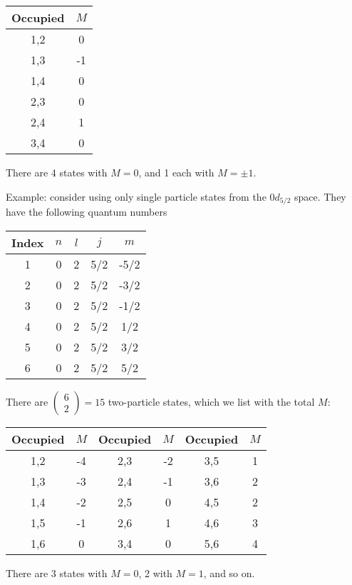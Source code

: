 \begin{center}
\begin{tabular}{|c|c|}\hline
Occupied & $M$  \\ \hline
1,2 & 0    \\
1,3 & -1              \\
1,4 & 0             \\
2,3 & 0           \\
2,4 & 1 \\
3,4 &  0     \\ \hline
\end{tabular}
There are 4 states with $M= 0$, 
and 1 each with $M = \pm 1$.
\end{center}

Example: consider using only single particle states from the $0d_{5/2}$ space. 
They have the following quantum numbers

\begin{center}

\begin{tabular}{|c|c|c|c|c|} \hline
Index & $n$ & $l$  & $j$ & $m$ \\ \hline 
1 & 0 & 2 & 5/2 & -5/2 \\
2 & 0 & 2 & 5/2 & -3/2 \\
3 & 0 & 2 & 5/2 & -1/2 \\
4 & 0 & 2 & 5/2 & 1/2 \\
5 & 0 & 2 & 5/2 & 3/2 \\
6 & 0 & 2 & 5/2 &  5/2 \\ \hline
\end{tabular}
%
\end{center}
There are $\left ( \begin{array}{c} 6 \\ 2 \end{array} \right) = 15$ two-particle states, 
which we list with the total $M$:

\begin{center}
\begin{tabular}{|c|c||c|c||c|c|}\hline
Occupied & $M$ & Occupied & $M$ &Occupied & $M$ \\ \hline
1,2 & -4   &  2,3 & -2  &  3,5 & 1 \\
1,3 & -3  &  2,4 & -1 &    3,6 & 2             \\
1,4 & -2  &  2,5 & 0 &     4,5 & 2            \\
1,5 & -1  &  2,6 & 1 &     4,6 & 3          \\
1,6 & 0  &  3,4 & 0 &      5,6 & 4         \\ \hline
\end{tabular}

\end{center}
There are 3 states with $M= 0$, 2 with $M = 1$, and so on.

